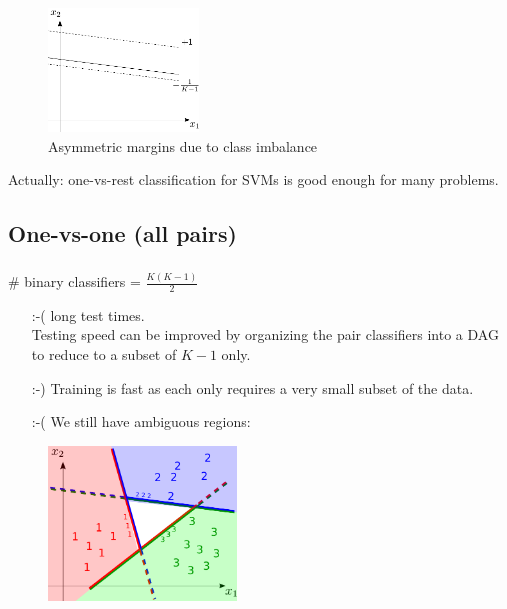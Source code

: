 \begin{frame}

\begin{figure}[h]
     \centering
	 \includegraphics[width=4cm]{img/asymmetric}
     \caption{Asymmetric margins due to class imbalance}
	 \label{fig:imbalance}
\end{figure}

Actually: one-vs-rest classification for SVMs is good enough for many problems.

    
\end{frame}

\subsection{One-vs-one (all pairs)}

\begin{frame}\frametitle{\subsecname}

\# binary classifiers = $\frac{K(K-1)}{2}$ 

\begin{itemize}
\item[:-(] long test times.\\
    Testing speed can be improved by organizing the pair classifiers into a DAG to reduce to a subset of $K-1$ only.
\item[:-)] Training is fast as each only requires a very small subset of the data. 
\item[:-(] We still have ambiguous regions:    
\end{itemize}

\begin{figure}[h]
     \centering
	 \includegraphics[width=5cm]{img/3classes_onevsone_majority}
	 \label{fig:onevsone}
\end{figure}
    
\end{frame}

